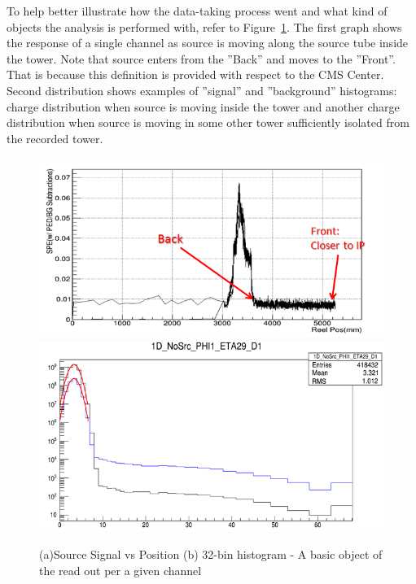 To help better illustrate how the data-taking process went and what kind of objects the analysis is performed with, refer to Figure~\ref{fig:hf_campaigns_histograms}. The first graph shows the response of a single channel as source is moving along the source tube inside the tower. Note that source enters from the ''Back'' and moves to the ''Front''. That is because this definition is provided with respect to the CMS Center. Second distribution shows examples of ''signal'' and ''background'' histograms: charge distribution when source is moving inside the tower and another charge distribution when source is moving in some other tower sufficiently isolated from the recorded tower.
\begin{figure}[htb]
    \begin{center}
        \includegraphics[width=.8\textwidth]{figures/ch_hfcalibration/Signal_ReelPos.png}
        \includegraphics[width=.8\textwidth]{figures/ch_hfcalibration/Signal_Histogram.png}
        \caption
        {(a)Source Signal vs Position (b) 32-bin histogram - A basic object of the read out per a given channel}
        \label{fig:hf_campaigns_histograms}
    \end{center}
\end{figure}


